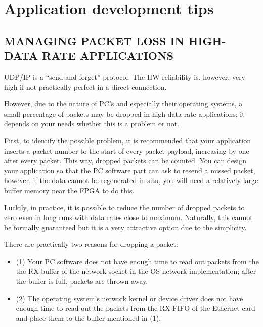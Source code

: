 \documentclass[a4paper,10pt,oneside,final]{article}
\begin{document}
\newpage
\section{Application development tips}

\subsection{MANAGING PACKET LOSS IN HIGH-DATA RATE APPLICATIONS}

UDP/IP is a ``send-and-forget'' protocol. The HW reliability is,
however, very high if not practically perfect in a direct connection.

However, due to the nature of PC's and especially their operating
systems, a small percentage of packets may be dropped in high-data
rate applications; it depends on your needs whether this is a problem
or not.

First, to identify the possible problem, it is recommended that your
application inserts a packet number to the start of every packet
payload, increasing by one after every packet. This way, dropped
packets can be counted.  You can design your application so that the
PC software part can ask to resend a missed packet, however, if the
data cannot be regenerated in-situ, you will need a relatively large
buffer memory near the FPGA to do this.

Luckily, in practice, it is possible to reduce the number of dropped
packets to zero even in long runs with data rates close to maximum. Naturally,
this cannot be formally guaranteed but it is a very attractive option due
to the simplicity.

There are practically two reasons for dropping a packet:

\begin{itemize}
\item (1) Your PC software does not have enough time to read out packets
  from the the RX buffer of the network socket in the OS network
  implementation; after the buffer is full, packets are thrown away.
\item (2) The operating system's network kernel or device driver does
  not have enough time to read out the packets from the RX FIFO of the
  Ethernet card and place them to the buffer mentioned in (1).
\end{itemize}
\end{document}
